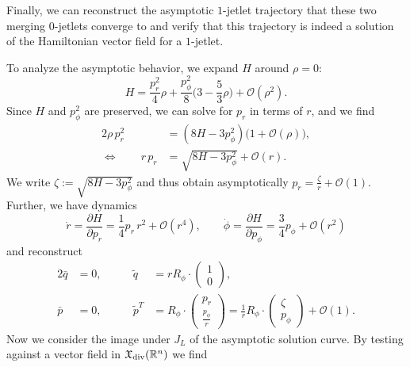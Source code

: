 \documentclass[12pt]{amsart}
\newcommand{\R}{\ensuremath{\mathbb{R}}}
\begin{document}
Finally, we can reconstruct the asymptotic $1$-jetlet trajectory that
these two merging $0$-jetlets converge to and verify that this
trajectory is indeed a solution of the Hamiltonian vector field for a
$1$-jetlet.

To analyze the asymptotic behavior, we expand $H$ around $\rho = 0$:
\begin{equation*}
  H = \frac{p_r^2      }{4} \rho
     +\frac{p_\phi^2}{8}\big(3 - \frac{5}{3}\rho\big)
     +\mathcal{O}(\rho^2).
\end{equation*}
Since $H$ and $p_\phi^2$ are preserved, we can solve for $p_r$ in
terms of $r$, and we find
\begin{align*}
  2\rho\,p_r^2 &= (8H - 3 p_\phi^2) \big(1 + \mathcal{O}(\rho)\big), \\
\Longleftrightarrow \qquad
      r\,p_r   &= \sqrt{8H - 3 p_\phi^2} + \mathcal{O}(r).
\end{align*}
We write $\zeta := \sqrt{8H - 3 p_\phi^2}$ and thus obtain
asymptotically $p_r = \frac{\zeta}{r} + \mathcal{O}(1)$. Further, we
have dynamics
\begin{equation*}
  \dot{r} = \frac{\partial H}{\partial p_r} = \frac{1}{4}p_r\,r^2 + \mathcal{O}(r^4), \qquad
  \dot{\phi} = \frac{\partial H}{\partial p_\phi}
                 = \frac{3}{4}p_\phi + \mathcal{O}(r^2)
\end{equation*}
and reconstruct
\begin{alignat*}{2}
  \bar{q}   &= 0,& \qquad
  \tilde{q} &= r R_\phi \cdot\begin{pmatrix} 1 \\ 0 \end{pmatrix},\\
  \bar{p}   &= 0,& \qquad
\tilde{p}^T &= R_\phi \cdot
               \begin{pmatrix} p_r \\ \frac{p_\phi}{r} \end{pmatrix}
             = \frac{1}{r} R_\phi \cdot
               \begin{pmatrix} \zeta \\ p_\phi \end{pmatrix} + \mathcal{O}(1).
\end{alignat*}
Now we consider the image under $J_L$ of the asymptotic solution
curve. By testing against a vector field in $\mathfrak{X}_{\rm
  div}(\R^n)$ we find
\end{document}
